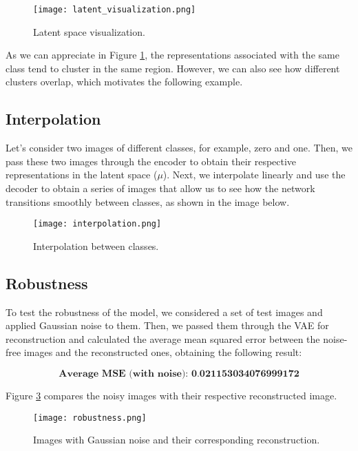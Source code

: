 \documentclass[twocolumn, 9pt]{article}
\begin{document}
\begin{figure}[ht]
\centering
\texttt{[image: latent\_visualization.png]}
\caption{Latent space visualization.}
\label{fig:example2}
\end{figure}

As we can appreciate in Figure \ref{fig:example2}, the representations associated with the same class tend to cluster in the same region. However, we can also see how different clusters overlap, which motivates the following example.

\subsection{Interpolation}

Let's consider two images of different classes, for example, zero and one. Then, we pass these two images through the encoder to obtain their respective representations in the latent space ($\mu$). Next, we interpolate linearly and use the decoder to obtain a series of images that allow us to see how the network transitions smoothly between classes, as shown in the image below.

\begin{figure}[ht]
\centering
\texttt{[image: interpolation.png]}
\caption{Interpolation between classes.}
\label{fig:example3}
\end{figure}

\subsection{Robustness}

To test the robustness of the model, we considered a set of test images and applied Gaussian noise to them. Then, we passed them through the VAE for reconstruction and calculated the average mean squared error between the noise-free images and the reconstructed ones, obtaining the following result:

$$
\textbf{Average MSE (with noise): 0.021153034076999172}
$$

Figure \ref{fig:example4} compares the noisy images with their respective reconstructed image.

\begin{figure}[ht]
\centering
\texttt{[image: robustness.png]}
\caption{Images with Gaussian noise and their corresponding reconstruction.}
\label{fig:example4}
\end{figure}
\end{document}
